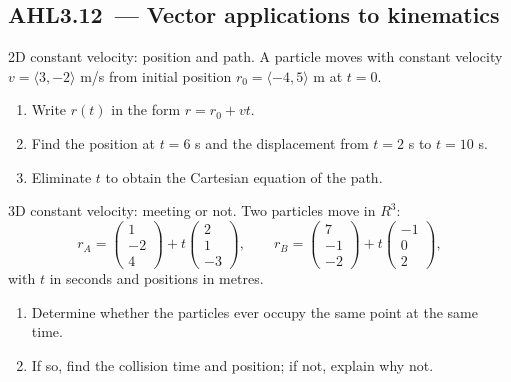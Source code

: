 \documentclass[11pt]{article}
\def\textbf#1{#1}%
\def\mathbb#1{#1}%
\def\mathbf#1{#1}%
\newcommand{\tocsubsection}[1]{\subsection{#1}}
\newcounter{question}
\begin{document}
\tocsubsection{AHL3.12 — Vector applications to kinematics}


\begin{question}
\textbf{2D constant velocity: position and path.}
A particle moves with constant velocity \(\mathbf{v}=\langle 3,-2\rangle\) m/s from initial position \(\mathbf{r}_0=\langle -4,5\rangle\) m at \(t=0\).
\begin{enumerate}
  \item Write \(\mathbf{r}(t)\) in the form \(\mathbf{r}=\mathbf{r}_0+\mathbf{v}t\).
  \item Find the position at \(t=6\) s and the displacement from \(t=2\) s to \(t=10\) s.
  \item Eliminate \(t\) to obtain the Cartesian equation of the path.
\end{enumerate}
\end{question}

\begin{question}
\textbf{3D constant velocity: meeting or not.}
Two particles move in \(\mathbb{R}^3\):
\[
\mathbf{r}_A=\begin{pmatrix}1\\-2\\4\end{pmatrix}+t\begin{pmatrix}2\\1\\-3\end{pmatrix},\qquad
\mathbf{r}_B=\begin{pmatrix}7\\-1\\-2\end{pmatrix}+t\begin{pmatrix}-1\\0\\2\end{pmatrix},
\]
with \(t\) in seconds and positions in metres.
\begin{enumerate}
  \item Determine whether the particles ever occupy the same point at the same time.
  \item If so, find the collision time and position; if not, explain why not.
\end{enumerate}
\end{question}
\end{document}

